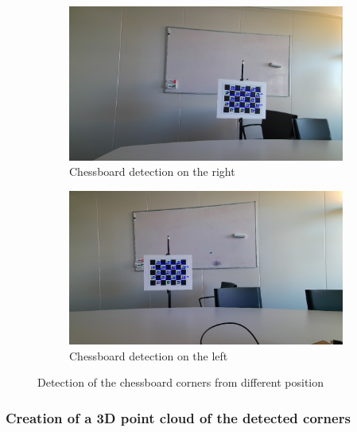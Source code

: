 \begin{figure}[H]
\centering
  \begin{subfigure}[b]{0.48 \textwidth}
    \includegraphics[width=\textwidth]{images/registration/imgr_board_detected.png}
    \caption{Chessboard detection on the right}
    \label{figure:imgr_board_detected}
  \end{subfigure}
  \hfill
  \begin{subfigure}[b]{0.48 \textwidth}
    \includegraphics[width=\textwidth]{images/registration/imgl_board_detected.png}
    \caption{Chessboard detection on the left}
    \label{figure:imgl_board_detected}
  \end{subfigure}
  \caption{Detection of the chessboard corners from different position}
  \label{figure:img_board_detected}
\end{figure}


\subsubsection{Creation of a 3D point cloud of the detected corners}
\label{section:creation_3d_pc_corners}

